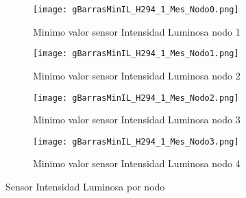 \documentclass{article}
\begin{document}
        \begin{figure}[h!]
            \centering\begin{subfigure}[h]{0.42\linewidth}
                                    \texttt{[image: gBarrasMinIL\_H294\_1\_Mes\_Nodo0.png]}
                                    \caption{Minimo valor sensor Intensidad Luminosa nodo 1}
                                    \label{fig:ILMin1}
                                \end{subfigure}
                                \begin{subfigure}[h]{0.42\linewidth}
                                    \texttt{[image: gBarrasMinIL\_H294\_1\_Mes\_Nodo1.png]}
                                    \caption{Minimo valor sensor Intensidad Luminosa nodo 2}
                                    \label{fig:ILMin2}
                                \end{subfigure}
                                \begin{subfigure}[h]{0.42\linewidth}
                                    \texttt{[image: gBarrasMinIL\_H294\_1\_Mes\_Nodo2.png]}
                                    \caption{Minimo valor sensor Intensidad Luminosa nodo 3}
                                    \label{fig:ILMin3}
                                \end{subfigure}
                                \begin{subfigure}[h]{0.42\linewidth}
                                    \texttt{[image: gBarrasMinIL\_H294\_1\_Mes\_Nodo3.png]}
                                    \caption{Minimo valor sensor Intensidad Luminosa nodo 4}
                                    \label{fig:ILMin4}
                                \end{subfigure}
                                \caption{Sensor Intensidad Luminosa por nodo}
                \label{fig:fig9}
            \end{figure}
        
\end{document}
